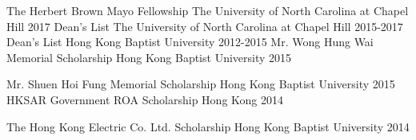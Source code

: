 

\begin{cvhonors}

 \cvhonor
    {The Herbert Brown Mayo Fellowship} %
    {The University of North Carolina at Chapel Hill} %
    {} %
    {2017} %
  \cvhonor
    {Dean's List} %
    {The University of North Carolina at Chapel Hill} %
    {} %
    {2015-2017} %
  \cvhonor
    {Dean's List} %
    {Hong Kong Baptist University} %
    {} %
    {2012-2015} %
  \cvhonor
    {Mr. Wong Hung Wai Memorial Scholarship} %
    {Hong Kong Baptist University} %
    {}
    {2015} %
    
  \cvhonor
    {Mr. Shuen Hoi Fung Memorial Scholarship} %
    {Hong Kong Baptist University} %
    {}
    {2015} %
  \cvhonor
    {HKSAR Government ROA Scholarship} %
    {Hong Kong} %
    {}
    {2014} %

  \cvhonor
    {The Hong Kong Electric Co. Ltd. Scholarship} %
    {Hong Kong Baptist University} %
    {}
    {2014} %


\end{cvhonors}

